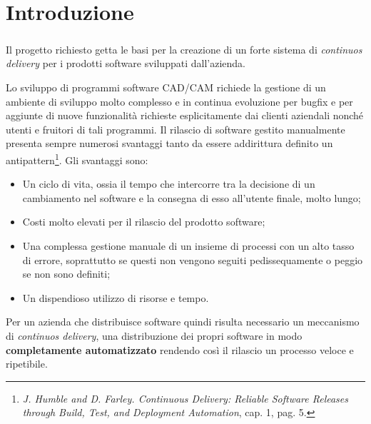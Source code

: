 \documentclass[../RelazioneFinale.tex]{subfiles}
\begin{document}
	\chapter{Introduzione}
	
		\paragraph*{}
		Il progetto richiesto getta le basi per la creazione di un forte sistema di \emph{continuos delivery} per i prodotti software sviluppati dall'azienda.
		
		Lo sviluppo di programmi software CAD/CAM richiede la gestione di un ambiente di sviluppo molto complesso e in continua evoluzione per bugfix e per aggiunte di nuove funzionalità richieste esplicitamente dai clienti aziendali nonché utenti e fruitori di tali programmi.	
		 Il rilascio di software gestito manualmente presenta sempre numerosi svantaggi tanto da essere addirittura definito un antipattern\footnote{ \cite{humble2010continuous} \emph{J. Humble and D. Farley. Continuous Delivery: Reliable Software Releases through Build, Test, and Deployment Automation}, cap. 1, pag. 5.}. Gli svantaggi sono:
		\begin{itemize}
			\item Un ciclo di vita, ossia il tempo che intercorre tra la decisione di un cambiamento nel software e la consegna di esso all'utente finale, molto lungo;
			\item Costi molto elevati per il rilascio del prodotto software;
			\item Una complessa gestione manuale di un insieme di processi con un alto tasso di errore, soprattutto se questi non vengono seguiti pedissequamente o peggio se non sono definiti;
			\item Un dispendioso utilizzo di risorse e tempo. 
		\end{itemize} 
		
		Per un azienda che distribuisce software quindi risulta necessario un meccanismo di \emph{continuos delivery}, una distribuzione dei propri software in modo \textbf{completamente automatizzato} rendendo così il rilascio un processo veloce e ripetibile.
		
\end{document}
